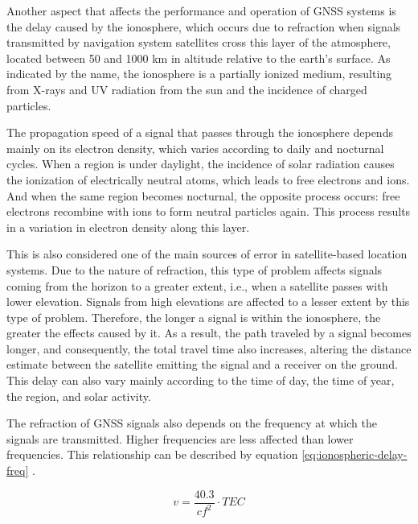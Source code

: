
Another aspect that affects the performance and operation of GNSS systems is the delay caused by the ionosphere, which occurs due to refraction when signals transmitted by navigation system satellites cross this layer of the atmosphere, located between 50 and 1000 km in altitude relative to the earth's surface. As indicated by the name, the ionosphere is a partially ionized medium, resulting from X-rays and UV radiation from the sun and the incidence of charged particles.

The propagation speed of a signal that passes through the ionosphere depends mainly on its electron density, which varies according to daily and nocturnal cycles. When a region is under daylight, the incidence of solar radiation causes the ionization of electrically neutral atoms, which leads to free electrons and ions. And when the same region becomes nocturnal, the opposite process occurs: free electrons recombine with ions to form neutral particles again. This process results in a variation in electron density along this layer.

This is also considered one of the main sources of error in satellite-based location systems. Due to the nature of refraction, this type of problem affects signals coming from the horizon to a greater extent, i.e., when a satellite passes with lower elevation. Signals from high elevations are affected to a lesser extent by this type of problem. Therefore, the longer a signal is within the ionosphere, the greater the effects caused by it. As a result, the path traveled by a signal becomes longer, and consequently, the total travel time also increases, altering the distance estimate between the satellite emitting the signal and a receiver on the ground. This delay can also vary mainly according to the time of day, the time of year, the region, and solar activity.

The refraction of GNSS signals also depends on the frequency at which the signals are transmitted. Higher frequencies are less affected than lower frequencies. This relationship can be described by equation \ref{eq:ionospheric-delay-freq} \cite{brunner1993}.

\begin{equation} \label{eq:ionospheric-delay-freq}
    v = \frac{40.3}{cf^{2}} \cdot TEC
\end{equation}

